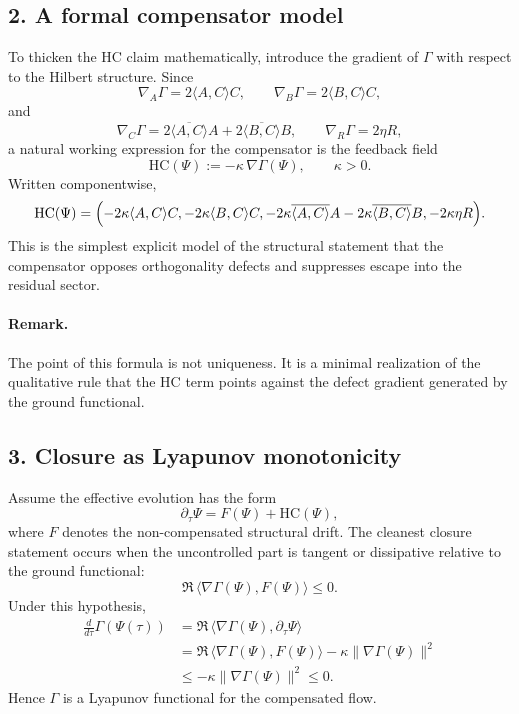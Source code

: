 \subsection*{2. A formal compensator model}
To thicken the HC claim mathematically, introduce the gradient of $\Gamma$ with
respect to the Hilbert structure. Since
\[
\nabla_A \Gamma = 2\langle A,C\rangle C,
\qquad
\nabla_B \Gamma = 2\langle B,C\rangle C,
\]
and
\[
\nabla_C \Gamma = 2\overline{\langle A,C\rangle}A + 2\overline{\langle B,C\rangle}B,
\qquad
\nabla_R \Gamma = 2\eta R,
\]
a natural working expression for the compensator is the feedback field
\[
\mathrm{HC}(\Psi) := -\kappa\,\nabla \Gamma(\Psi), \qquad \kappa>0.
\]
Written componentwise,
\[
\mathrm{HC}(\Psi) =
\Bigl(
-2\kappa\langle A,C\rangle C,
-2\kappa\langle B,C\rangle C,
-2\kappa\overline{\langle A,C\rangle}A -2\kappa\overline{\langle B,C\rangle}B,
-2\kappa\eta R
\Bigr).
\]
This is the simplest explicit model of the structural statement that the
compensator opposes orthogonality defects and suppresses escape into the
residual sector.

\paragraph{Remark.}
The point of this formula is not uniqueness. It is a minimal realization of the
qualitative rule that the HC term points against the defect gradient generated
by the ground functional.

\subsection*{3. Closure as Lyapunov monotonicity}
Assume the effective evolution has the form
\[
\partial_\tau \Psi = F(\Psi) + \mathrm{HC}(\Psi),
\]
where $F$ denotes the non-compensated structural drift. The cleanest closure
statement occurs when the uncontrolled part is tangent or dissipative relative
to the ground functional:
\[
\Re\,\langle \nabla\Gamma(\Psi),F(\Psi)\rangle \le 0.
\tag{T}
\]
Under this hypothesis,
\begin{align*}
\frac{d}{d\tau}\Gamma(\Psi(\tau))
&= \Re\,\langle \nabla\Gamma(\Psi),\partial_\tau\Psi\rangle \\
&= \Re\,\langle \nabla\Gamma(\Psi),F(\Psi)\rangle
   - \kappa\|\nabla\Gamma(\Psi)\|^2 \\
&\le -\kappa\|\nabla\Gamma(\Psi)\|^2 \le 0.
\end{align*}
Hence $\Gamma$ is a Lyapunov functional for the compensated flow.

